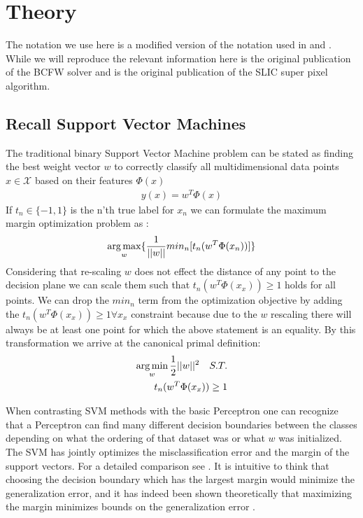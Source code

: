 \chapter{Theory}


The notation we use here is a modified version of the notation used in \cite{lucchi2012structured} and \cite{lacoste2012block}. While we will reproduce the relevant information here \cite{lacoste2012block} is the original publication of the BCFW solver and \cite{slicPaper} is the original publication of the SLIC super pixel algorithm. 
\section{Recall Support Vector Machines}
The traditional binary Support Vector Machine problem can be stated as finding the best weight vector $w$ to correctly classify all multidimensional data points $x \in \mathcal{X}$ based on their features $\Phi(x)$
\begin{align}
y(x)=w^T\Phi(x)
\end{align} If $t_n \in\{-1,1\}$ is the n'th true label for $x_n$ we can formulate the maximum margin optimization problem as :
\begin{align}
\operatorname*{arg\,max}_w\{ \frac{1}{||w||} min_n [t_n (w^T\Phi(x_n))] \}  
\end{align}
Considering that re-scaling $w$ does not effect the distance of any point to the decision plane we can scale  them such that $t_n(w^T\Phi(x_x))\geq 1$ holds for all points.  We can drop the $min_n$ term from the optimization objective by adding the $t_n(w^T\Phi(x_x))\geq 1 \forall x_x$ constraint because due to the $w$ rescaling there will always be at least one point for which the above statement is an equality. By this transformation we arrive at the canonical primal definition: 
  \begin{align}
  \operatorname*{arg\,min}_w \frac{1}{2} ||w||^2 \quad S.T. \\ 
  t_n(w^T\Phi(x_x))\geq 1 
  \end{align} 
 
  \par When contrasting SVM methods with the basic Perceptron one can recognize that a Perceptron can find many different decision boundaries between the classes depending on what the ordering of that dataset was or what $w$ was initialized. The SVM has jointly optimizes the misclassification error and the margin of the support vectors. For a detailed comparison see \cite{meyer2003support}. It is intuitive to think that choosing the decision boundary which has the largest margin would minimize the generalization error, and it has indeed been shown theoretically that maximizing the margin minimizes bounds on the generalization error \cite{boser1992training}.
  
